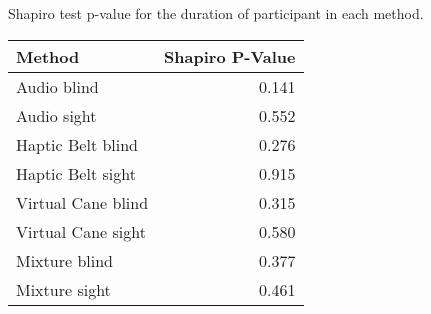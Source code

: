 
\centering
\caption{Shapiro test p-value for the duration of participant in each method.}
\label{tab:shapiro_duration}
\begin{tabular}{lr}
\toprule
            Method &  Shapiro P-Value \\
\midrule
       Audio blind &            0.141 \\
       Audio sight &            0.552 \\
 Haptic Belt blind &            0.276 \\
 Haptic Belt sight &            0.915 \\
Virtual Cane blind &            0.315 \\
Virtual Cane sight &            0.580 \\
     Mixture blind &            0.377 \\
     Mixture sight &            0.461 \\
\bottomrule
\end{tabular}
